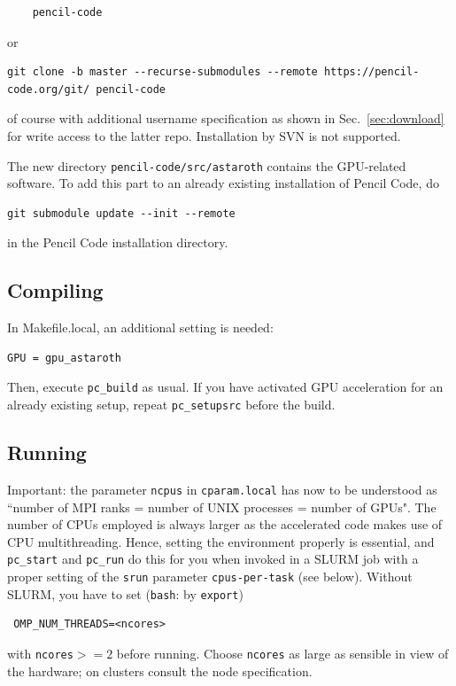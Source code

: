 \documentclass[a4paper,12pt]{article}
\newcommand{\command}[1]{\texttt{#1}}
\newcommand{\code}[1]{\texttt{#1}}
\begin{document}
\vspace{-2mm}
\begin{verbatim}
    pencil-code
\end{verbatim}
or
\begin{verbatim}
git clone -b master --recurse-submodules --remote https://pencil-code.org/git/ pencil-code
\end{verbatim}
of course with additional username specification as shown in Sec.~\ref{sec:download} for write access to the latter repo.
Installation by SVN is not supported.

The new directory
\code{pencil-code/src/astaroth} contains the GPU-related software.
To add this part to an already existing installation of Pencil Code, do
\begin{verbatim}
git submodule update --init --remote
\end{verbatim}
in the Pencil Code installation directory.

\subsection{Compiling}
In Makefile.local,  an additional setting is needed:
\begin{verbatim}
GPU = gpu_astaroth
\end{verbatim}

Then, execute \command{pc\_build} as usual.
If you have activated GPU acceleration for an already existing setup, repeat \command{pc\_setupsrc} before the build.

\subsection{Running}
Important: the parameter \command{ncpus} in \command{cparam.local} has now to be understood as ``number of MPI ranks = number of UNIX processes = number of GPUs". The number of CPUs employed is always larger  as
the accelerated code makes use of CPU multithreading. Hence, setting the environment properly is essential, and \command{pc\_start} and \command{pc\_run} do this for you when invoked in a SLURM job with a proper setting of the \code{srun} parameter \code{cpus-per-task} (see below). Without SLURM, you have to set
(\code{bash}: by \command{export})
\begin{verbatim}
 OMP_NUM_THREADS=<ncores>
\end{verbatim}
with \command{ncores}$ >=2$ before running.
Choose \command{ncores} as large as sensible in view of the hardware; on clusters consult the node specification.
\end{document}
